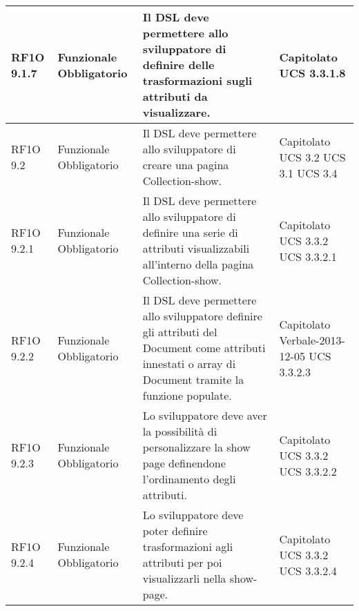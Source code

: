 \begin{center}
\begin{longtable}{ | l | p{2cm} | p{5cm} | p{1.7cm} |}
        RF1O 9.1.7 & Funzionale \newline  Obbligatorio  & Il DSL deve permettere allo sviluppatore di definire delle trasformazioni sugli attributi da visualizzare. &  Capitolato \newline  UCS 3.3.1.8 \newline  \\ \hline      
        RF1O 9.2 & Funzionale \newline  Obbligatorio  & Il DSL deve permettere allo sviluppatore di creare una pagina Collection-show. &  Capitolato \newline  UCS 3.2 \newline  UCS 3.1 \newline  UCS 3.4 \newline  \\ \hline      
        RF1O 9.2.1 & Funzionale \newline  Obbligatorio  & Il DSL deve permettere allo sviluppatore di definire una serie di attributi visualizzabili all’interno della pagina Collection-show. &  Capitolato \newline  UCS 3.3.2 \newline  UCS 3.3.2.1 \newline  \\ \hline      
        RF1O 9.2.2 & Funzionale \newline  Obbligatorio  & Il DSL deve permettere allo sviluppatore definire gli attributi del Document come attributi innestati o array di Document tramite la funzione populate. &  Capitolato \newline  Verbale-2013-12-05 \newline  UCS 3.3.2.3 \newline  \\ \hline      
        RF1O 9.2.3 & Funzionale \newline  Obbligatorio  & Lo sviluppatore deve aver la possibilità di personalizzare la show page definendone l’ordinamento degli attributi. &  Capitolato \newline  UCS 3.3.2 \newline  UCS 3.3.2.2 \newline  \\ \hline      
        RF1O 9.2.4 & Funzionale \newline  Obbligatorio  & Lo sviluppatore deve poter definire trasformazioni agli attributi per poi visualizzarli nella show-page. &  Capitolato \newline  UCS 3.3.2 \newline  UCS 3.3.2.4 \newline  \\ \hline      

\end{longtable}
\end{center}
